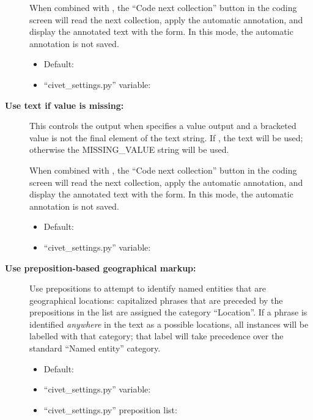 \documentclass[letterpaper,10pt,english]{sphinxmanual}
\begin{document}
\begin{description}
When combined with , the
“Code next collection” button in the coding screen will read the next
collection, apply the automatic annotation, and display the annotated
text with the form. In this mode, the automatic annotation is not
saved.
\begin{itemize}
\item {} 
Default: 

\item {} 
“civet\_settings.py” variable: 

\end{itemize}

\item[{\textbf{Use text if value is missing:}}] \leavevmode
This controls the output when  specifies a value output and a
bracketed value is not the final element of the text string.  If ,
the text will be
used; otherwise the MISSING\_VALUE string will be used.

When combined with , the
“Code next collection” button in the coding screen will read the next
collection, apply the automatic annotation, and display the annotated
text with the form. In this mode, the automatic annotation is not
saved.
\begin{itemize}
\item {} 
Default: 

\item {} 
“civet\_settings.py” variable: 

\end{itemize}

\item[{\textbf{Use preposition-based geographical markup:}}] \leavevmode
Use prepositions to attempt to identify named entities that are geographical
locations: capitalized phrases that are preceded by the prepositions in the
list  are assigned the category “Location”. If a
phrase is identified \emph{anywhere} in the text as a possible
locations, all instances will be labelled with that category; that
label will take precedence over the standard “Named entity” category.
\begin{itemize}
\item {} 
Default: 

\item {} 
“civet\_settings.py” variable: 

\item {} 
“civet\_settings.py” preposition list: 

\end{itemize}

\end{description}
\end{document}
